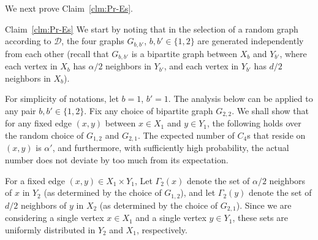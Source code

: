 \smallskip
\noindent
 We next prove Claim~\ref{clm:Pr-Es}.

 \smallskip
\begin{proofof}{Claim~\ref{clm:Pr-Es}}
We start by noting that in the selection of a random graph according to $\mathcal{D}$, the four graphs $G_{b,b'}$, $b,b' \in \{1,2\}$ are generated independently from each other (recall that $G_{b,b'}$ is a bipartite graph between $X_b$ and $Y_{b'}$, where each vertex in $X_b$ has $\alpha/2$ neighbors in $Y_{b'}$, and each vertex in $Y_{b'}$ has $d/2$ neighbors in $X_b$).

\medskip
For simplicity of notations, let $b=1$, $b'=1$.
The analysis below can be applied to any pair $b,b' \in \{1,2\}$.
Fix any choice of bipartite graph $G_{2,2}$.
We shall show that for any fixed edge $(x,y)$ between $x\in X_1$ and $y \in Y_1$, the following holds over the random choice of $G_{1,2}$ and $G_{2,1}$.
The expected number of $C_4$s that reside on $(x,y)$ is $\alpha'$, and furthermore, with sufficiently high probability, the actual number does not deviate by too much from its expectation.

For a fixed edge $(x,y)\in X_1\times Y_1$,
Let $\Gamma_2(x)$ denote  the set of $\alpha/2$ neighbors of $x$ in $Y_2$ (as determined by the choice of $G_{1,2}$), and let $\Gamma_2(y)$ denote the set of $d/2$ neighbors of $y$ in $X_2$ (as determined by the choice of $G_{2,1}$). Since we are considering a single vertex $x\in X_1$ and a single vertex $y\in Y_1$, these sets are uniformly distributed in $Y_2$ and $X_1$, respectively.


\end{proofof}
